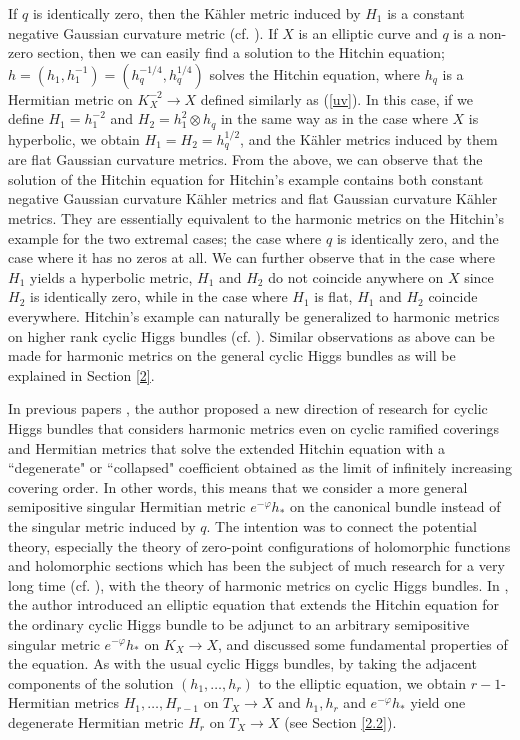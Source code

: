 \documentclass[12pt]{article}
\theoremstyle{definition}
\def\refe{\ast}
\begin{document}
If $q$ is identically zero, then the K\"ahler metric induced by $H_1$ is a constant negative Gaussian curvature metric (cf. \cite[Section 11]{Hit1}). If $X$ is an elliptic curve and $q$ is a non-zero section, then we can easily find a solution to the Hitchin equation; $h=(h_1, h_1^{-1})=(h_q^{-1/4}, h_q^{1/4})$ solves the Hitchin equation, where $h_q$ is a Hermitian metric on $K_X^{-2}\rightarrow X$ defined similarly as (\ref{uv}). In this case, if we define $H_1=h_1^{-2}$ and $H_2=h_1^2\otimes h_q$ in the same way as in the case where $X$ is hyperbolic, we obtain $H_1=H_2=h_q^{1/2}$, and the K\"ahler metrics induced by them are flat Gaussian curvature metrics. From the above, we can observe that the solution of the Hitchin equation for Hitchin's example contains both constant negative Gaussian curvature K\"ahler metrics and flat Gaussian curvature K\"ahler metrics. They are essentially equivalent to the harmonic metrics on the Hitchin's example for the two extremal cases; the case where $q$ is identically zero, and the case where it has no zeros at all. We can further observe that in the case where $H_1$ yields a hyperbolic metric, $H_1$ and $H_2$ do not coincide anywhere on $X$ since $H_2$ is identically zero, while in the case where $H_1$ is flat, $H_1$ and $H_2$ coincide everywhere. Hitchin's example can naturally be generalized to harmonic metrics on higher rank cyclic Higgs bundles (cf. \cite{Bar1, Hit2}). Similar observations as above can be made for harmonic metrics on the general cyclic Higgs bundles as will be explained in Section \ref{2}.

In previous papers \cite{Miy2, Miy3}, the author proposed a new direction of research for cyclic Higgs bundles that considers harmonic metrics even on cyclic ramified coverings and Hermitian metrics that solve the extended Hitchin equation with a ``degenerate" or ``collapsed" coefficient obtained as the limit of infinitely increasing covering order. In other words, this means that we consider a more general semipositive singular Hermitian metric $e^{-\varphi}h_\refe$ on the canonical bundle instead of the singular metric induced by $q$. The intention was to connect the potential theory, especially the theory of zero-point configurations of holomorphic functions and holomorphic sections which has been the subject of much research for a very long time (cf. \cite{BCHM1, FKMR1, Ran1, ST1, SZ1}), with the theory of harmonic metrics on cyclic Higgs bundles. In \cite{Miy2, Miy3}, the author introduced an elliptic equation that extends the Hitchin equation for the ordinary cyclic Higgs bundle to be adjunct to an arbitrary semipositive singular metric $e^{-\varphi} h_\refe$ on $K_X\rightarrow X$, and discussed some fundamental properties of the equation. As with the usual cyclic Higgs bundles, by taking the adjacent components of the solution $(h_1,\dots, h_r)$ to the elliptic equation, we obtain $r-1$-Hermitian metrics $H_1,\dots, H_{r-1}$ on $T_X\rightarrow X$ and $h_1, h_r$ and $e^{-\varphi}h_\refe$ yield one degenerate Hermitian metric $H_r$ on $T_X\rightarrow X$ (see Section \ref{2.2}).
\end{document}
